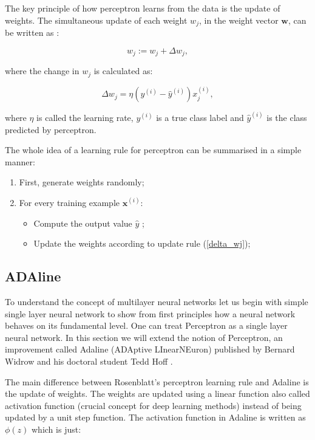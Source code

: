 \documentclass[a4paper,oneside,openright,11pt]{book}
\begin{document}
The key principle of how perceptron learns from the data is the update of weights. The simultaneous update of each weight $w_{j}$, in the weight vector $\textbf{w}$, can be written as \cite{raschka}:

\begin{equation} \label{update_rule}
    w_{j} := w_{j} + \Delta w_{j},
\end{equation}

where the change in $w_{j}$ is calculated as:


\begin{equation} \label{delta_wj}
    \Delta w_{j} = \eta (y^{(i)} - \hat{y}^{(i)}) x_{j}^{(i)},
\end{equation}

where $\eta$ is called the learning rate, $y^{(i)}$ is a true class label and $\hat{y}^{(i)}$ is the class predicted by perceptron.

The whole idea of a learning rule for perceptron can be summarised in a simple manner:

\begin{enumerate}
    \item First, generate weights randomly;
    \item For every training example $\textbf{x}^{(i)}$:
    \begin{itemize}
        \item Compute the output value $\hat{{y}}$ ;
        \item Update the weights according to update rule (\ref{delta_wj});
    \end{itemize}
\end{enumerate}

\subsection{ADAline}

To understand the concept of multilayer neural networks let us begin with simple single layer neural network to show from first principles how a neural network behaves on its fundamental level. One can treat Perceptron as a single layer neural network. In this section we will extend the notion of Perceptron, an improvement called Adaline (ADAptive LInearNEuron) published by Bernard Widrow and his doctoral student Tedd Hoff \cite{adaline}.

The main difference between Rosenblatt's perceptron learning rule and Adaline is the update of weights. The weights are updated using a linear function also called activation function (crucial concept for deep learning methods) instead of being updated by a unit step function. The activation function in Adaline is written as $\phi(z)$ which is just:
\end{document}
